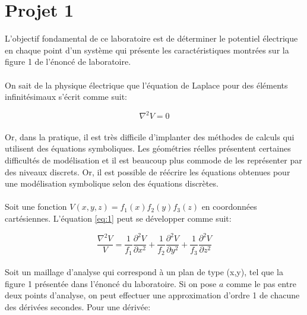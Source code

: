 



\label{s:experimentation}
\section{Projet 1}

L'objectif fondamental de ce laboratoire est de déterminer le potentiel électrique en chaque point d'un système qui présente les caractéristiques montrées sur la figure 1 de l'énoncé de laboratoire. 

\paragraph{} On sait de la physique électrique que l'équation de Laplace pour des éléments infinitésimaux s'écrit comme suit:

\begin{equation}
\label{eq:1}
\nabla ^2 V = 0
\end{equation}

\paragraph{}Or, dans la pratique, il est très difficile d'implanter des méthodes de calculs qui utilisent des équations symboliques. Les géométries réelles présentent certaines difficultés de modélisation et il est beaucoup plus commode de les représenter par des niveaux discrets. Or, il est possible de réécrire les équations obtenues pour une modélisation symbolique selon des équations discrètes. 

\paragraph{}Soit une fonction $V(x,y,z) = f_1(x)f_2(y)f_3(z) $ en coordonnées cartésiennes. L'équation \ref{eq:1} peut se développer comme suit:

\begin{equation}
\frac{\nabla ^2 V}{V} = \frac{1}{f_1}\frac{\partial^2 V}{\partial x^2} + \frac{1}{f_2}\frac{\partial^2 V}{\partial y^2} + \frac{1}{f_3}\frac{\partial^2 V}{\partial z^2}
\end{equation}

\paragraph{} Soit un maillage d'analyse qui correspond à un plan de type (x,y), tel que la figure 1 présentée dans l'énoncé du laboratoire. Si on pose $a$ comme le pas entre deux points d'analyse, on peut effectuer une approximation d'ordre 1 de chacune des dérivées secondes. Pour une dérivée:

